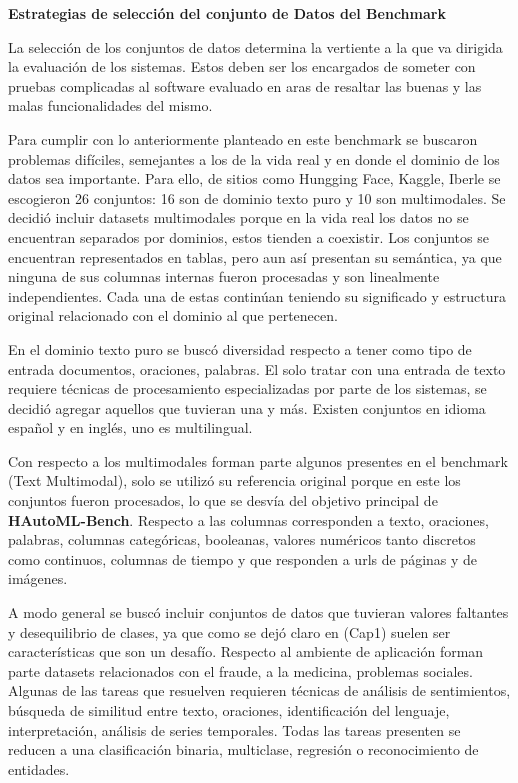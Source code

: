 \begin{flushleft} 
    {\large { \textbf{Estrategias de selección del conjunto de Datos del Benchmark}}}\label{section:selection}
\end{flushleft}
La selección de los conjuntos de datos determina la vertiente a la que va dirigida la evaluación de los sistemas. Estos deben ser los encargados de someter con 
pruebas complicadas al software evaluado en aras de resaltar las buenas y las malas funcionalidades del mismo.

Para cumplir con lo anteriormente planteado en este benchmark se buscaron problemas difíciles, semejantes a los de la vida real y en donde el dominio de los datos 
sea importante. Para ello, de sitios como Hungging Face, Kaggle, Iberle se escogieron 26 conjuntos: 16 son de dominio texto puro y 10 son multimodales. Se decidió 
incluir datasets multimodales porque en la vida real los datos no se encuentran separados por dominios, estos tienden a coexistir. Los conjuntos se encuentran 
representados en tablas, pero aun así presentan su semántica, ya que ninguna de sus columnas internas fueron procesadas y son linealmente independientes. Cada una de 
estas continúan teniendo su significado y estructura original relacionado con el dominio al que pertenecen.

En el dominio texto puro se buscó diversidad respecto a tener como tipo de entrada documentos, oraciones, palabras. El solo tratar con una entrada de texto requiere 
técnicas de procesamiento especializadas por parte de los sistemas, se decidió agregar aquellos que tuvieran una y más. Existen conjuntos en idioma español y en inglés, 
uno es multilingual.

Con respecto a los multimodales forman parte algunos presentes en el benchmark (Text Multimodal), solo se utilizó su referencia original porque en este los conjuntos 
fueron procesados, lo que se desvía del objetivo principal de \textbf{HAutoML-Bench}. Respecto a las columnas corresponden a texto, oraciones, palabras, columnas categóricas, 
booleanas, valores numéricos tanto discretos como continuos, columnas de tiempo y que responden a urls de páginas y de imágenes.

A modo general se buscó incluir conjuntos de datos que tuvieran valores faltantes y desequilibrio de clases, ya que como se dejó claro en (Cap1) suelen ser 
características que son un desafío. Respecto al ambiente de aplicación forman parte datasets relacionados con el fraude, a la medicina, problemas sociales. Algunas de 
las tareas que resuelven requieren técnicas de análisis de sentimientos, búsqueda de similitud entre texto, oraciones, identificación del lenguaje, interpretación, 
análisis de series temporales. Todas las tareas presenten se reducen a una clasificación binaria, multiclase, regresión o reconocimiento de entidades.

